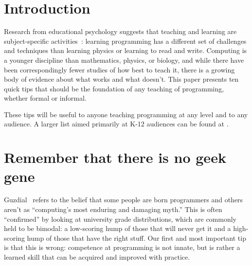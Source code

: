 \documentclass[10pt,letterpaper]{article}
\newcommand{\rulemajor}[2]{\section{#1}\label{#2}}
\newcommand{\evidence}[1]{}
\begin{document}



\section*{Introduction}

Research from educational psychology suggests that teaching and learning are subject-specific
activities~\cite{mayer-subject}: learning programming has a different set of challenges and techniques
than learning physics or learning to read and write.  Computing is a younger discipline than
mathematics, physics, or biology, and while there have been correspondingly fewer studies of how best to teach it,
there is a growing body of evidence about what works and what doesn't.
This paper presents ten quick tips that should be the foundation of any teaching of programming, whether
formal or informal.

These tips will be useful to anyone teaching programming at any level
and to any audience. A larger list aimed primarily at K-12 audiences
can be found at \cite{cs-teaching-tips}.

\rulemajor{Remember that there is no geek gene}{gene}
\evidence{Medium\footnote{Our evidence strength is an informal assessment, factoring in whether the effect has been replicated, and whether it has been shown specifically in computing, or only in other disciplines from which we believe it will transfer.}}

Guzdial~\cite{guzdial-myths} refers to the belief that some people are born programmers and others aren't
as ``computing's most enduring and damaging myth.''
This is often ``confirmed'' by looking at university grade distributions,
which are commonly held to be bimodal:
a low-scoring hump of those that will never get it
and a high-scoring hump of those that have the right stuff.
Our first and most important tip is that this is wrong:
competence at programming is not innate,
but is rather a learned skill that can be acquired and improved with practice.
\end{document}
